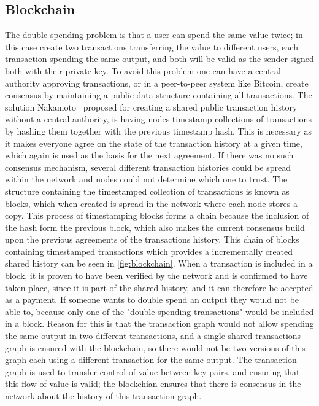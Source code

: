 \subsection{Blockchain}
\label{subsec:blockchain}

The double spending problem is that a user can spend the same value twice; in this case create two transactions transferring the value to different users, each transaction spending the same output, and both will be valid as the sender signed both with their private key. To avoid this problem one can have a central authority approving transactions, or in a peer-to-peer system like Bitcoin, create consensus by maintaining a public data-structure containing all transactions. The solution Nakamoto~\cite{nakamoto2008bitcoin} proposed for creating a shared public transaction history without a central authority, is having nodes timestamp collections of transactions by hashing them together with the previous timestamp hash. This is necessary as it makes everyone agree on the state of the transaction history at a given time, which again is used as the basis for the next agreement. If there was no such consensus mechanism, several different transaction histories could be spread within the network and nodes could not determine which one to trust.
The structure containing the timestamped collection of transactions is known as blocks, which when created is spread in the network where each node stores a copy. 
This process of timestamping blocks forms a chain because the inclusion of the hash form the previous block, which also makes the current consensus build upon the previous agreements of the transactions history. This chain of blocks containing timestamped transactions which provides a incrementally created shared history can be seen in \cref{fig:blockchain}. When a transaction is included in a block, it is proven to have been verified by the network and is confirmed to have taken place, since it is part of the shared history, and it can therefore be accepted as a payment. If someone wants to double spend an output they would not be able to, because only one of the "double spending transactions" would be included in a block. Reason for this is that the transaction graph would not allow spending the same output in two different transactions, and a single shared transactions graph is ensured with the blockchain, so there would not be two versions of this graph each using a different transaction for the same output. The transaction graph is used to transfer control of value between key pairs, and ensuring that this flow of value is valid; the blockchian ensures that there is consensus in the network about the history of this transaction graph.
\\

